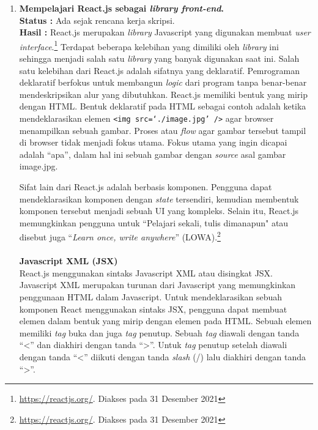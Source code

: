 \documentclass[a4paper,twoside]{article}
\begin{document}
\begin{enumerate}
\begin{itemize}
		\end{itemize}
		
		
		\item \textbf{Mempelajari React.js sebagai \textit{library front-end}.}\\
		{\bf Status :} Ada sejak rencana kerja skripsi.\\
		{\bf Hasil :} React.js merupakan \textit{library} Javascript yang  digunakan membuat \textit{user interface}.\footnote{\url{https://reactjs.org/}. Diakses pada 31 Desember 2021} Terdapat beberapa kelebihan yang dimiliki oleh \textit{library} ini sehingga menjadi  salah satu \textit{library} yang banyak digunakan saat ini. Salah satu kelebihan dari React.js adalah sifatnya yang deklaratif. Pemrograman deklaratif berfokus untuk membangun \textit{logic} dari program tanpa benar-benar mendeskripsikan alur yang dibutuhkan. React.js memiliki bentuk yang mirip dengan HTML. Bentuk deklaratif pada HTML sebagai contoh adalah ketika mendeklarasikan elemen \texttt{<img src=`./image.jpg' />} agar browser menampilkan sebuah gambar. Proses atau \textit{flow} agar gambar tersebut tampil di browser tidak menjadi fokus utama. Fokus utama yang ingin dicapai adalah ``apa'', dalam hal ini sebuah gambar dengan \textit{source} asal gambar image.jpg.
		
		Sifat lain dari React.js adalah berbasis komponen. Pengguna dapat mendeklarasikan komponen dengan \textit{state} tersendiri, kemudian membentuk komponen tersebut menjadi sebuah UI yang kompleks. Selain itu, React.js memungkinkan pengguna untuk ``Pelajari sekali, tulis dimanapun" atau disebut juga ``\textit{Learn once, write anywhere}'' (LOWA).\footnote{\url{https://reactjs.org/}. Diakses pada 31 Desember 2021}
		\\
		\\
		\setlength\parindent{0pt}
		\textbf{Javascript XML (JSX)}\\
		React.js menggunakan sintaks Javascript XML atau disingkat JSX. Javascript XML merupakan turunan dari Javascript yang memungkinkan penggunaan HTML dalam Javascript. Untuk mendeklarasikan sebuah komponen React menggunakan sintaks JSX, pengguna dapat membuat elemen dalam bentuk yang mirip dengan elemen pada HTML. Sebuah elemen memiliki \textit{tag} buka dan juga \textit{tag} penutup. Sebuah \textit{tag} diawali dengan tanda ``<'' dan diakhiri dengan tanda ``>''. Untuk \textit{tag} penutup setelah diawali dengan tanda ``<'' diikuti dengan tanda \textit{slash} (/) lalu diakhiri dengan tanda ``>''.
		

\end{enumerate}
\end{document}
